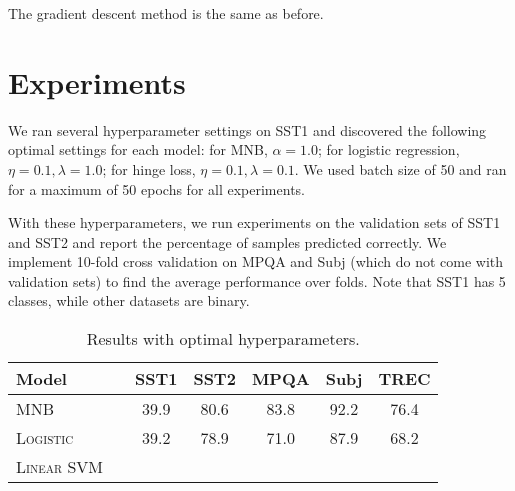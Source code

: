 \documentclass[11pt]{article}
\begin{document}
The gradient descent method is the same as before.


\begin{figure}

  \begin{algorithmic}[1]

    \EndWhile{}
    \EndProcedure{}
  \end{algorithmic}

\end{figure}


\section{Experiments}

We ran several hyperparameter settings on SST1 and discovered the following optimal settings for each model: for MNB, $\alpha = 1.0$; for logistic regression, $\eta = 0.1, \lambda = 1.0$; for hinge loss, $\eta = 0.1, \lambda = 0.1$. We used batch size of 50 and ran for a maximum of 50 epochs for all experiments.

With these hyperparameters, we run experiments on the validation sets of SST1 and SST2 and report the percentage of samples predicted correctly. We implement 10-fold cross validation on MPQA and Subj (which do not come with validation sets) to find the average performance over folds. Note that SST1 has 5 classes, while other datasets are binary.

\begin{table}[h]
\centering
\begin{tabular}{llccccc}
 \toprule
 Model &  & SST1 & SST2 & MPQA & Subj & TREC \\
 \midrule
 \textsc{MNB} & & 39.9 & 80.6 & 83.8 & 92.2 & 76.4\\
 \textsc{Logistic} & & 39.2 & 78.9 & 71.0 & 87.9 & 68.2 \\
 \textsc{Linear SVM} & &  & &  & \\
 \bottomrule
\end{tabular}
\caption{\label{tab:results} Results with optimal hyperparameters.}
\end{table}
\end{document}
